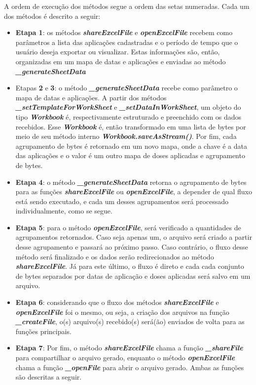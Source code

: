 A ordem de execução dos métodos segue a ordem das setas numeradas. Cada um dos métodos é descrito a seguir:

\begin{itemize}
  \item \textbf{Etapa 1}: os métodos \textbf{\textit{shareExcelFile}} e \textbf{\textit{openExcelFile}} recebem como parâmetros a lista das aplicações cadastradas e o período de tempo que o usuário deseja exportar ou visualizar. Estas informações são, então, organizadas em um mapa de datas e aplicações e enviadas ao método \textbf{\textit{\_generateSheetData}}
  \item Etapas \textbf{2} e \textbf{3}: o método \textbf{\textit{\_generateSheetData}} recebe como parâmetro o mapa de datas e aplicações. A partir dos métodos \textbf{\textit{\_setTemplateForWorkSheet}} e \textbf{\textit{\_setDataInWorkSheet}}, um objeto do tipo \textbf{\textit{Workbook}} é, respectivamente estruturado e preenchido com os dados recebidos. Esse \textbf{\textit{Workbook}} é, então transformado em uma lista de bytes por meio de seu método interno \textbf{\textit{Workbook.saveAsStream()}}. Por fim, cada agrupamento de bytes é retornado em um novo mapa, onde a chave é a data das aplicações e o valor é um outro mapa de doses aplicadas e agrupamento de bytes.
  \item \textbf{Etapa 4}: o método \textbf{\textit{\_generateSheetData}} retorna o agrupamento de bytes para as funções \textbf{\textit{shareExcelFile}} ou \textbf{\textit{openExcelFile}}, a depender de qual fluxo está sendo executado, e cada um desses agrupamentos será processado individualmente, como se segue.
  \item \textbf{Etapa 5}: para o método \textbf{\textit{openExcelFile}}, será verificado a quantidades de agrupamentos retornados. Caso seja apenas um, o arquivo será criado a partir desse agrupamento e passará ao próximo passo. Caso contrário, o fluxo desse método será finalizado e os dados serão redirecionados ao método \textbf{\textit{shareExcelFile}}. Já para este último, o fluxo é direto e cada cada conjunto de bytes separados por datas de aplicação e doses aplicadas será salvo em um arquivo.
  \item \textbf{Etapa 6}: considerando que o fluxo dos métodos \textbf{\textit{shareExcelFile}} e \textbf{\textit{openExcelFile}} foi o mesmo, ou seja, a criação dos arquivos na função \textbf{\textit{\_createFile}}, o(s) arquivo(s) recebido(s) será(ão) enviados de volta para as funções principais.
  \item \textbf{Etapa 7}: Por fim, o método \textbf{\textit{shareExcelFile}} chama a função \textbf{\textit{\_shareFile}} para compartilhar o arquivo gerado, enquanto o método \textbf{\textit{openExcelFile}} chama a função \textbf{\textit{\_openFile}} para abrir o arquivo gerado. Ambas as funções são descritas a seguir.
\end{itemize}


